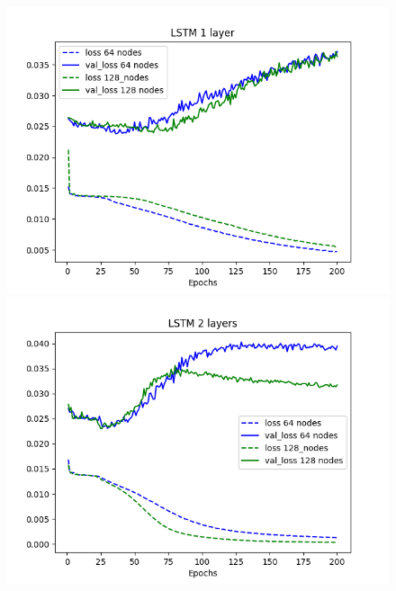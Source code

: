 \documentclass[11pt]
{article}
\begin{document}
\begin{figure}[H]
\begin{minipage}[b]{0.33\linewidth}
		\includegraphics[width=\linewidth]{../TESTS_RESULTS/LSTM_tests/plots/1_comp.png} 
	\end{minipage}%
	\begin{minipage}[b]{0.33\linewidth}
		\centering
		\includegraphics[width=\linewidth]{../TESTS_RESULTS/LSTM_tests/plots/2_comp.png} 
	\end{minipage} 
	\begin{minipage}[b]{0.33\linewidth}
		\centering

\end{minipage}
\end{figure}
\end{document}
